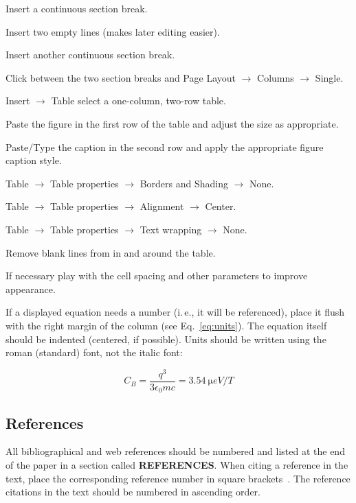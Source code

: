 \documentclass[a4paper,
              ]{jacow}
\newcommand\SEC[1]{\textbf{\uppercase{#1}}}
\begin{document}
\begin{Enumerate}
\item	Insert a continuous section break.
\item	Insert two empty lines (makes later editing easier).
\item	Insert another continuous section break.
\item	Click between the two section breaks and Page Layout $\rightarrow$
        Columns $\rightarrow$ Single.
\item	Insert $\rightarrow$ Table select a one-column, two-row table.
\item	Paste the figure in the first row of the table and adjust the size as appropriate.
\item	Paste/Type the caption in the second row and apply the appropriate figure caption style.
\item	Table $\rightarrow$ Table properties $\rightarrow$ Borders and
        Shading $\rightarrow$ None.
\item	Table $\rightarrow$ Table properties $\rightarrow$ Alignment $\rightarrow$ Center.
\item	Table $\rightarrow$ Table properties $\rightarrow$ Text wrapping $\rightarrow$ None.
\item	Remove blank lines from in and around the table.
\item	If necessary play with the cell spacing and other parameters to improve appearance.
\end{Enumerate}

If a displayed equation needs a number (i.\,e., it will be referenced), place it flush with the right margin of the column (see Eq.~\ref{eq:units}). The equation itself should be indented (centered, if possible). Units should be written using the roman (standard) font,
not the italic font:

\begin{equation}\label{eq:units}
    C_B=\frac{q^3}{3\epsilon_{0} mc}=\SI{3.54}{\micro eV/T}
\end{equation}

\subsection{References}

All bibliographical and web references should be numbered and listed at the
end of the paper in a section called \SEC{References}. When citing a
reference in the text, place the corresponding reference number in square
brackets~\cite{exampl-ref}. The reference citations in the text should be numbered
in ascending order.
\end{document}
